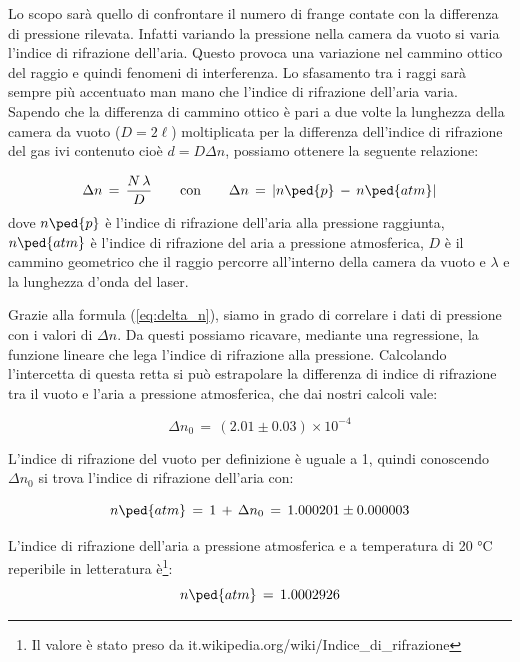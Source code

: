 Lo scopo sarà quello di confrontare il numero di frange contate con la differenza di pressione rilevata.
Infatti variando la pressione nella camera da vuoto si varia l'indice di rifrazione dell'aria.
Questo provoca una variazione nel cammino ottico del raggio  e quindi fenomeni di interferenza.
Lo sfasamento tra i raggi sarà sempre più accentuato man mano che l'indice di rifrazione dell'aria varia.
Sapendo che la differenza di cammino ottico è pari a due volte la lunghezza della camera da vuoto ($D = 2\ell$)
moltiplicata per la differenza dell'indice di rifrazione del gas ivi contenuto
cioè $d = D\Delta n$, possiamo ottenere la seguente relazione:

\begin{equation}
	\Delta{n} \,=\, \frac{N \, \lambda}{D} \qquad \text{con} \qquad \Delta{n} \,=\, |n\ped{p} \,-\, n\ped{atm}|
	\label{eq:delta_n}
\end{equation}
%
dove $n\ped{p}$ è l'indice di rifrazione dell'aria alla pressione raggiunta, $n\ped{atm}$ è l'indice di rifrazione del aria a pressione atmosferica, $D$ è il cammino geometrico che il raggio percorre all'interno della camera da vuoto e $\lambda$ e la lunghezza d'onda del laser.

Grazie alla formula (\ref{eq:delta_n}), siamo in grado di correlare i dati di pressione con i valori di $\Delta n$. Da questi possiamo
ricavare, mediante una regressione, la funzione lineare che lega l'indice di rifrazione alla pressione.
Calcolando l'intercetta di questa retta si può estrapolare la differenza di indice di rifrazione tra il vuoto e l'aria a pressione
atmosferica, che dai nostri calcoli vale:

\begin{equation}
    \Delta n_0 \,=\, (2.01 \pm 0.03) \times 10^{-4}
\end{equation}

L'indice di rifrazione del vuoto per definizione è uguale a 1, quindi conoscendo $\Delta n_0$ si trova l'indice di rifrazione dell'aria con:

\begin{equation}
	n\ped{atm} \,=\, 1 \,+\, \Delta n_0 \,=\, 1.000201 \pm 0.000003 
	\label{eq:indice_rif_aria}
\end{equation}

L'indice di rifrazione dell'aria a pressione atmosferica e a temperatura di 20 $\si{\degreeCelsius}$ reperibile in letteratura è\footnote{Il valore è stato preso da it.wikipedia.org/wiki/Indice\_di\_rifrazione}:
\begin{equation}
n\ped{atm} \, = \, 1.000 292 6
\end{equation}

